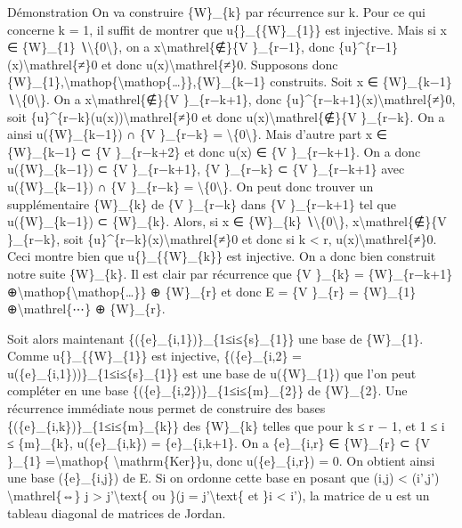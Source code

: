\documentclass[]{article}
\begin{document}
Démonstration On va construire \{W\}\_\{k\} par récurrence sur k. Pour
ce qui concerne k = 1, il suffit de montrer que
u\{\textbar{}\}\_\{\{W\}\_\{1\}\} est injective. Mais si x ∈
\{W\}\_\{1\} ∖\textbackslash{}\{0\textbackslash{}\}, on a
x\textbackslash{}mathrel\{∉\}\{V \}\_\{r−1\}, donc
\{u\}\^{}\{r−1\}(x)\textbackslash{}mathrel\{≠\}0 et donc
u(x)\textbackslash{}mathrel\{≠\}0. Supposons donc
\{W\}\_\{1\},\textbackslash{}mathop\{\textbackslash{}mathop\{\ldots{}\}\},\{W\}\_\{k−1\}
construits. Soit x ∈ \{W\}\_\{k−1\}
∖\textbackslash{}\{0\textbackslash{}\}. On a
x\textbackslash{}mathrel\{∉\}\{V \}\_\{r−k+1\}, donc
\{u\}\^{}\{r−k+1\}(x)\textbackslash{}mathrel\{≠\}0, soit
\{u\}\^{}\{r−k\}(u(x))\textbackslash{}mathrel\{≠\}0 et donc
u(x)\textbackslash{}mathrel\{∉\}\{V \}\_\{r−k\}. On a ainsi
u(\{W\}\_\{k−1\}) ∩ \{V \}\_\{r−k\} =
\textbackslash{}\{0\textbackslash{}\}. Mais d'autre part x ∈
\{W\}\_\{k−1\} ⊂ \{V \}\_\{r−k+2\} et donc u(x) ∈ \{V \}\_\{r−k+1\}. On
a donc u(\{W\}\_\{k−1\}) ⊂ \{V \}\_\{r−k+1\}, \{V \}\_\{r−k\} ⊂ \{V
\}\_\{r−k+1\} avec u(\{W\}\_\{k−1\}) ∩ \{V \}\_\{r−k\} =
\textbackslash{}\{0\textbackslash{}\}. On peut donc trouver un
supplémentaire \{W\}\_\{k\} de \{V \}\_\{r−k\} dans \{V \}\_\{r−k+1\}
tel que u(\{W\}\_\{k−1\}) ⊂ \{W\}\_\{k\}. Alors, si x ∈ \{W\}\_\{k\}
∖\textbackslash{}\{0\textbackslash{}\}, x\textbackslash{}mathrel\{∉\}\{V
\}\_\{r−k\}, soit \{u\}\^{}\{r−k\}(x)\textbackslash{}mathrel\{≠\}0 et
donc si k \textless{} r, u(x)\textbackslash{}mathrel\{≠\}0. Ceci montre
bien que u\{\textbar{}\}\_\{\{W\}\_\{k\}\} est injective. On a donc bien
construit notre suite \{W\}\_\{k\}. Il est clair par récurrence que \{V
\}\_\{k\} = \{W\}\_\{r−k+1\}
⊕\textbackslash{}mathop\{\textbackslash{}mathop\{\ldots{}\}\} ⊕
\{W\}\_\{r\} et donc E = \{V \}\_\{r\} = \{W\}\_\{1\}
⊕\textbackslash{}mathrel\{⋯\} ⊕ \{W\}\_\{r\}.

Soit alors maintenant \{(\{e\}\_\{i,1\})\}\_\{1≤i≤\{s\}\_\{1\}\} une
base de \{W\}\_\{1\}. Comme u\{\textbar{}\}\_\{\{W\}\_\{1\}\} est
injective, \{(\{e\}\_\{i,2\} =
u(\{e\}\_\{i,1\}))\}\_\{1≤i≤\{s\}\_\{1\}\} est une base de
u(\{W\}\_\{1\}) que l'on peut compléter en une base
\{(\{e\}\_\{i,2\})\}\_\{1≤i≤\{m\}\_\{2\}\} de \{W\}\_\{2\}. Une
récurrence immédiate nous permet de construire des bases
\{(\{e\}\_\{i,k\})\}\_\{1≤i≤\{m\}\_\{k\}\} des \{W\}\_\{k\} telles que
pour k ≤ r − 1, et 1 ≤ i ≤ \{m\}\_\{k\}, u(\{e\}\_\{i,k\}) =
\{e\}\_\{i,k+1\}. On a \{e\}\_\{i,r\} ∈ \{W\}\_\{r\} ⊂ \{V \}\_\{1\}
=\textbackslash{}mathop\{ \textbackslash{}mathrm\{Ker\}\}u, donc
u(\{e\}\_\{i,r\}) = 0. On obtient ainsi une base (\{e\}\_\{i,j\}) de E.
Si on ordonne cette base en posant que (i,j) \textless{} (i',j')
\textbackslash{}mathrel\{⇔\} j \textgreater{} j'\textbackslash{}text\{
ou \}(j = j'\textbackslash{}text\{ et \}i \textless{} i'), la matrice de
u est un tableau diagonal de matrices de Jordan.
\end{document}
